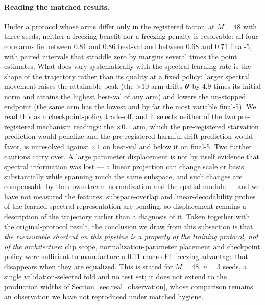\paragraph{Reading the matched results.}
Under a protocol whose arms differ only in the registered factor, at
$M{=}48$ with three seeds, neither a freezing benefit nor a freezing
penalty is resolvable: all four core arms lie between $0.81$ and $0.86$
best-val and between $0.68$ and $0.71$ final-5, with paired intervals
that straddle zero by margins several times the point estimates. What
does vary systematically with the spectral learning rate is the shape
of the trajectory rather than its quality at a fixed policy: larger
spectral movement raises the attainable peak (the $\times 10$ arm
drifts ${\boldsymbol{\theta}}$ by $4.9$ times its initial norm and attains the
highest best-val of any arm) and lowers the un-stopped endpoint (the
same arm has the lowest and by far the most variable final-5). We read
this as a checkpoint-policy trade-off, and it selects neither of the
two pre-registered mechanism readings: the $\times 0.1$ arm, which the
pre-registered starvation prediction would penalize and the
pre-registered harmful-drift prediction would favor, is unresolved
against $\times 1$ on best-val and below it on final-5. Two further
cautions carry over. A large parameter displacement is not by itself
evidence that spectral information was lost --- a linear projection can
change scale or basis substantially while spanning much the same
subspace, and such changes are compensable by the downstream
normalization and the spatial module --- and we have not measured the
features: subspace-overlap and linear-decodability probes of the
learned spectral representation are pending, so displacement remains a
description of the trajectory rather than a diagnosis of it. Taken
together with the original-protocol result, the conclusion we draw
from this subsection is that \emph{the measurable shortcut on this
pipeline is a property of the training protocol, not of the
architecture}: clip scope, normalization-parameter placement and
checkpoint policy were sufficient to manufacture a
$0.11$ macro-F1 freezing advantage that disappears when they are
equalized. This is stated for $M{=}48$, $n=3$ seeds, a single
validation-selected fold and no test set; it does not extend to the
production widths of Section~\ref{sec:real_observation}, whose
comparison remains an observation we have not reproduced under matched
hygiene.

